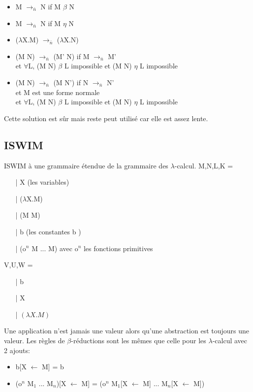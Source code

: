 \documentclass[10pt,a4paper]{article}
\begin{document}
			\begin{itemize}
				\item M $\longrightarrow_{\bar{n}}$ N if M $\beta$ N
				\item M $\longrightarrow_{\bar{n}}$ N if M $\eta$ N
				\item ($\lambda$X.M) $\longrightarrow_{\bar{n}}$ ($\lambda$X.N)
				\item (M N) $\longrightarrow_{\bar{n}}$ (M' N) if M $\longrightarrow_{\bar{n}}$ M'
				\\ et $\forall$L, (M N) $\beta$ L impossible et (M N) $\eta$ L impossible
				\item (M N) $\longrightarrow_{\bar{n}}$ (M N') if N $\longrightarrow_{\bar{n}}$ N'
				\\ et M est une forme normale
				\\ et  $\forall$L, (M N) $\beta$ L impossible et (M N) $\eta$ L impossible
			\end{itemize}
			
			Cette solution est s\^{u}r mais reste peut utilis\'{e} car elle est assez lente. 
			\newpage
		\subsection{ISWIM}	
			
			ISWIM à une grammaire étendue de la grammaire des $\lambda$-calcul.
			\smallbreak
			M,N,L,K =
			\begin{itemize}
				\item[|] X (les variables)
				\item[|] ($\lambda$X.M)
				\item[|] (M M)
				\item[|] b (les constantes b )
				\item[|] (o$^{n}$ M ... M) avec o$^{n}$ les fonctions primitives
			\end{itemize}
			\medbreak
			
			V,U,W =
			\begin{itemize}
				\item[|] b
				\item[|] X
				\item[|] $(\lambda X.M)$
			\end{itemize}
			
			
			Une application n'est jamais une valeur alors qu'une abstraction est toujours une valeur.
			\medbreak
			Les règles de $\beta$-réductions sont les mêmes que celle pour les $\lambda$-calcul avec 2 ajouts:
			\begin{itemize}
				\item b[X $\longleftarrow$ M] = b
				\item (o$^{n}$ M$_{1}$ ... M$_{n}$)[X $\longleftarrow$ M] = (o$^{n}$ M$_{1}$[X $\longleftarrow$ M] ... M$_{n}$[X $\longleftarrow$ M])
			\end{itemize}
			
\end{document}
